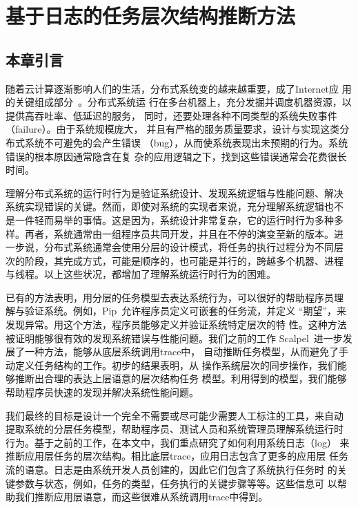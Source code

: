 \chapter{基于日志的任务层次结构推断方法}
\label{chap:logmining}

\section{本章引言}

随着云计算逐渐影响人们的生活，分布式系统变的越来越重要，成了Internet应
用的关键组成部分~\cite{gfs, mapreduce, bigtable, dynamo}。分布式系统运
行在多台机器上，充分发掘并调度机器资源，以提供高吞吐率、低延迟的服务，
同时，还要处理各种不同类型的系统失败事件（failure）。由于系统规模庞大，
并且有严格的服务质量要求，设计与实现这类分布式系统不可避免的会产生错误
（bug），从而使系统表现出未预期的行为。系统错误的根本原因通常隐含在复
杂的应用逻辑之下，找到这些错误通常会花费很长时间。

理解分布式系统的运行时行为是验证系统设计、发现系统逻辑与性能问题、解决
系统实现错误的关键。然而，即使对系统的实现者来说，充分理解系统逻辑也不
是一件轻而易举的事情。这是因为，系统设计非常复杂，它的运行时行为多种多
样。再者，系统通常由一组程序员共同开发，并且在不停的演变至新的版本。进
一步说，分布式系统通常会使用分层的设计模式，将任务的执行过程分为不同层
次的阶段，其完成方式，可能是顺序的，也可能是并行的，跨越多个机器、进程
与线程。以上这些状况，都增加了理解系统运行时行为的困难。

已有的方法表明，用分层的任务模型去表达系统行为，可以很好的帮助程序员理
解与验证系统。例如，Pip~\cite{pip}允许程序员定义可嵌套的任务流，并定义
“期望”，来发现异常。用这个方法，程序员能够定义并验证系统特定层次的特
性。这种方法被证明能够很有效的发现系统错误与性能问题。我们之前的工作
Scalpel~\cite{scalpel}进一步发展了一种方法，能够从底层系统调用trace中，
自动推断任务模型，从而避免了手动定义任务结构的工作。初步的结果表明，从
操作系统层次的同步操作，我们能够推断出合理的表达上层语意的层次结构任务
模型。利用得到的模型，我们能够帮助程序员快速的发现并解决系统性能问题。

我们最终的目标是设计一个完全不需要或尽可能少需要人工标注的工具，来自动
提取系统的分层任务模型，帮助程序员、测试人员和系统管理员理解系统运行时
行为。基于之前的工作，在本文中，我们重点研究了如何利用系统日志（log）
来推断应用层任务的层次结构。相比底层trace，应用日志包含了更多的应用层
任务流的语意。日志是由系统开发人员创建的，因此它们包含了系统执行任务时
的关键参数与状态，例如，任务的类型，任务执行的关键步骤等等。这些信息可
以帮助我们推断应用层语意，而这些很难从系统调用trace中得到。

